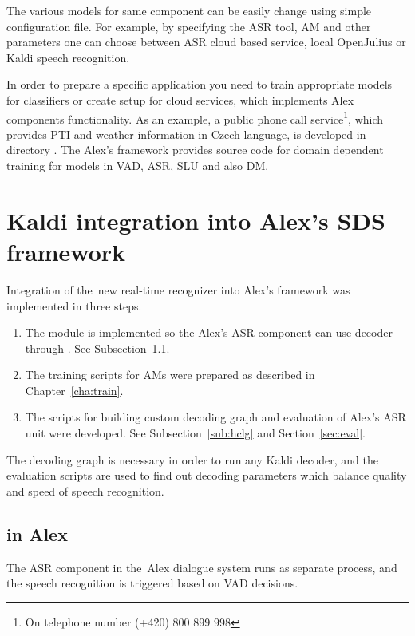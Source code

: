The various models for same component can be easily change using simple configuration file. 
For example, by specifying the \ac{ASR} tool, \ac{AM} and other parameters one can choose between \ac{ASR} cloud based service, local OpenJulius or Kaldi speech recognition.

In order to prepare a specific application you need to train appropriate models for classifiers or create setup for cloud services, which implements Alex components functionality.
As an example, a public phone call service\footnote{On telephone number (+420) 800 899 998}, which provides \ac{PTI} and weather information in Czech language,  is developed in directory .
The Alex's framework provides source code for domain dependent training for models in \ac{VAD}, \ac{ASR}, \ac{SLU} and also \ac{DM}.



\section[Kaldi integration into \acs{SDS} framework]{Kaldi integration into Alex's \acl{SDS} framework}
\label{sec:asrsds}

Integration of the~new real-time recognizer into Alex's framework was implemented in three steps.
\begin{enumerate}
    \item The  module is implemented so the Alex's \ac{ASR} component can use  decoder through .
        See Subsection~\ref{sub:asr_component}.
    \item  The training scripts for \acp{AM} were prepared as described in Chapter~\ref{cha:train}.
    \item  The scripts for building custom decoding graph  and evaluation of Alex's \ac{ASR} unit were developed.
        See Subsection~\ref{sub:hclg} and Section~\ref{sec:eval}.
\end{enumerate}

The decoding graph  is necessary in order to run any Kaldi decoder, and the evaluation scripts are used to find out decoding parameters which balance quality and speed of speech recognition.

\subsection{ in Alex}
\label{sub:asr_component}
The \ac{ASR} component in the~Alex dialogue system runs as separate process, and the speech recognition is triggered based on \ac{VAD} decisions.

